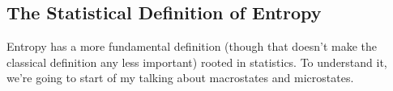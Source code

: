 \subsection{The Statistical Definition of Entropy}
Entropy has a more fundamental definition (though that doesn't make the classical definition any less important) rooted in statistics. To understand it, we're going to start of my talking about macrostates and microstates.



